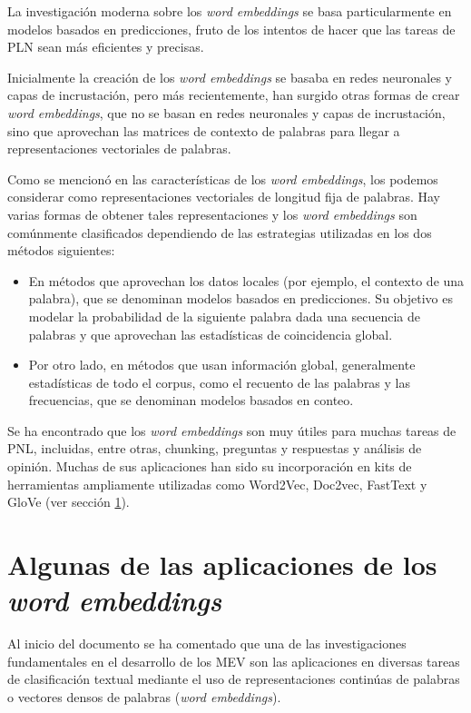 \documentclass[titlepage]{article}
\begin{document}
	La investigación moderna sobre los \textit{word embeddings} se basa particularmente en modelos basados en predicciones, fruto de los intentos de hacer que las tareas de PLN sean más eficientes y precisas. 
	
	Inicialmente la creación de los \textit{word embeddings} se basaba en redes neuronales y capas de incrustación, pero más recientemente, han surgido otras formas de crear \textit{word embeddings}, que no se basan en redes neuronales y capas de incrustación, sino que aprovechan las matrices de contexto de palabras para llegar a representaciones vectoriales de palabras. 
	
	Como se mencionó en las características de los \textit{word embeddings}, los podemos considerar como representaciones vectoriales de longitud fija de palabras. Hay varias formas de obtener tales representaciones y los \textit{word embeddings} son comúnmente clasificados dependiendo de las estrategias utilizadas en los dos métodos siguientes:
	
	\begin{itemize}
		\item En métodos que aprovechan los datos locales (por ejemplo, el contexto de una palabra), que se denominan modelos basados en predicciones. Su objetivo es modelar la probabilidad de la siguiente palabra dada una secuencia de palabras y que aprovechan las estadísticas de coincidencia global.
		\item Por otro lado, en métodos que usan información global, generalmente estadísticas de todo el corpus, como el recuento de las palabras y las frecuencias, que se denominan modelos basados en conteo. 
	\end{itemize}
	
	Se ha encontrado que los \textit{word embeddings} son muy útiles para muchas tareas de PNL, incluidas, entre otras, chunking, preguntas y respuestas y análisis de opinión. Muchas de sus aplicaciones han sido su incorporación en kits de herramientas ampliamente utilizadas como Word2Vec, Doc2vec, FastText y GloVe (ver sección \ref{aplicaciones}). 
	
	\section{Algunas de las aplicaciones de los \textit{word embeddings}}\label{aplicaciones}
	
	Al inicio del documento se ha comentado que una de las investigaciones fundamentales en el desarrollo de los MEV son las aplicaciones en diversas tareas de clasificación textual mediante el uso de representaciones continúas de palabras o vectores densos de palabras (\textit{word embeddings}). 
	
\end{document}
